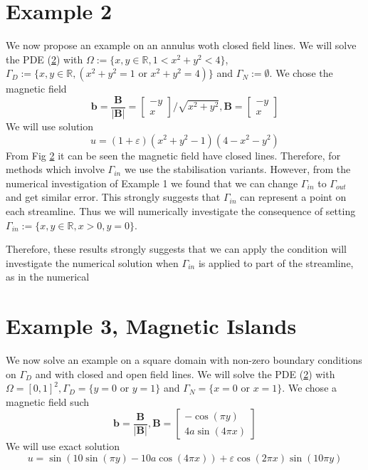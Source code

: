 \documentclass[12pt,a4paper]{article}
\begin{document}
\section{Example 2}
We now propose an example on an annulus woth closed field lines.
We will solve the PDE (\ref{}) with $\Omega := \{x,y \in \mathbb{R}, 1<x^2+y^2<4\}$, $\Gamma_D := \{x,y \in \mathbb{R}, (x^2+y^2=1 \text{ or } x^2+y^2=4)\}$ and $\Gamma_N := \emptyset$. We chose the magnetic field 
\begin{equation}
\mathbf{b} = \frac{\mathbf{B}}{|\mathbf{B}|} = 
\left[ \begin{matrix}
-y\\
 x
\end{matrix} \right]/\sqrt{x^2+y^2}, 
\mathbf{B} = \left[ \begin{matrix}
-y\\
 x
\end{matrix} \right]
\end{equation}
We will use solution
\begin{equation}
u = (1+\varepsilon)(x^2 + y^2 -1)(4-x^2-y^2)
\end{equation}
From Fig \ref{} it can be seen the magnetic field have closed lines. Therefore, for methods which involve $\Gamma_{in}$ we use the stabilisation variants. However, from the numerical investigation of Example 1 we found that we can change $\Gamma_{in}$ to $\Gamma_{out}$ and get similar error. This strongly suggests that $\Gamma_{in}$ can represent a point on each streamline. Thus we will numerically investigate the consequence of setting $\Gamma_{in}:=\{x,y \in \mathbb{R}, x>0, y=0\}$.




Therefore, these results strongly suggests that we can apply the condition  will investigate the numerical solution when $\Gamma_{in}$ is applied to part of the streamline, as in the numerical

\section{Example 3, Magnetic Islands}
We now solve an example on a square domain with non-zero boundary conditions on $\Gamma_D$ and with closed and open field lines.
We will solve the PDE (\ref{}) with $\Omega = [0,1]^2, \Gamma_D = \{y=0 \text{ or } y=1\}$ and $\Gamma_N = \{x=0 \text{ or } x=1\}$. We chose a magnetic field such 
\begin{equation}
\mathbf{b} = \frac{\mathbf{B}}{|\mathbf{B}|}, 
\mathbf{B} = \left[ \begin{matrix}
-\cos(\pi y)\\
4a \sin(4 \pi x)
\end{matrix} \right]
\end{equation}
We will use exact solution
\begin{equation}
u = \sin(10\sin(\pi y)-10a\cos(4 \pi x)) + \varepsilon \cos(2 \pi x)\sin(10 \pi y)
\end{equation}
\end{document}
